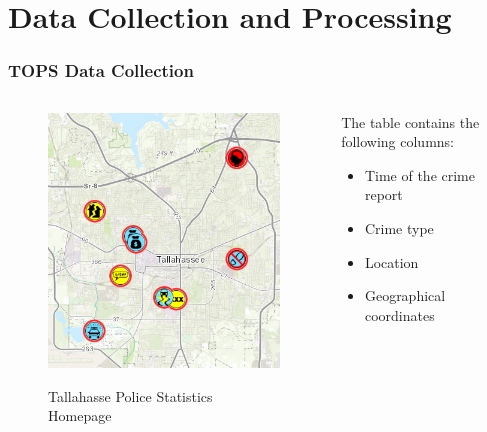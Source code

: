 \documentclass{beamer}
\begin{document}
\section{Data Collection and Processing}
\begin{frame}
    \frametitle{TOPS Data Collection}
    \begin{columns}[T] %
        \begin{column}{.48\textwidth}
            \begin{figure}
                \includegraphics[width=\linewidth]{Figures/TOPS.png} %
                \label{fig:tops}
                \caption{Tallahasse Police Statistics Homepage}
            \end{figure}
        \end{column}%

        \begin{column}{.48\textwidth}
            The table contains the following columns:
            \begin{itemize}
                \item Time of the crime report
                \item Crime type
                \item Location
                \item Geographical coordinates
            \end{itemize}
        \end{column}%
    \end{columns}


\end{frame}
\end{document}
